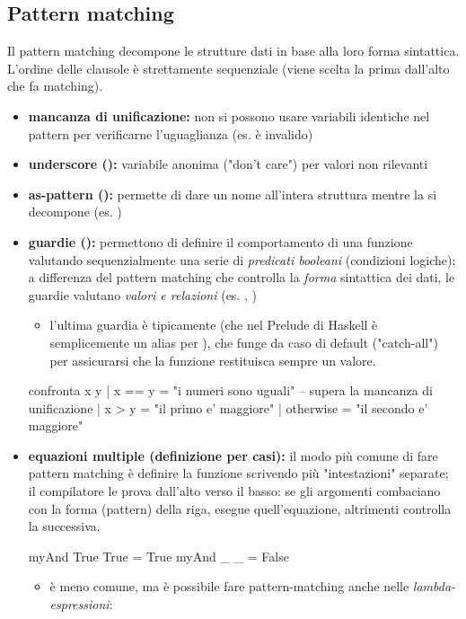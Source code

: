 \subsection{Pattern matching}
Il pattern matching decompone le strutture dati in base alla loro forma sintattica. L'ordine delle clausole è strettamente sequenziale (viene scelta la prima dall'alto che fa matching).
\begin{itemize}
    \item \textbf{mancanza di unificazione:} non si possono usare variabili identiche nel pattern per verificarne l'uguaglianza (es.  è invalido)
    \item \textbf{underscore (\code{\_}):} variabile anonima ("don't care") per valori non rilevanti
    \item \textbf{as-pattern ():} permette di dare un nome all'intera struttura mentre la si decompone (es. )
\item \textbf{guardie (\code{|}):} permettono di definire il comportamento di una funzione valutando sequenzialmente una serie di \textit{predicati booleani} (condizioni logiche); a differenza del pattern matching che controlla la \textit{forma} sintattica dei dati, le guardie valutano \textit{valori e relazioni} (es. , )
    \begin{itemize}
    \item l'ultima guardia è tipicamente  (che nel Prelude di Haskell è semplicemente un alias per ), che funge da caso di default ("catch-all") per assicurarsi che la funzione restituisca sempre un valore.
    \end{itemize}
\begin{haskellbox}{}
confronta x y
  | x == y    = "i numeri sono uguali" -- supera la mancanza di unificazione
  | x > y     = "il primo e' maggiore"
  | otherwise = "il secondo e' maggiore"
\end{haskellbox}{}
\item \textbf{equazioni multiple (definizione per casi):} il modo più comune di fare pattern matching è definire la funzione scrivendo più "intestazioni" separate; il compilatore le prova dall'alto verso il basso: se gli argomenti combaciano con la forma (pattern) della riga, esegue quell'equazione, altrimenti controlla la successiva.
\begin{haskellbox}{}
    myAnd True True = True
    myAnd   _   _   = False
\end{haskellbox}{}
\begin{itemize}
    \item è meno comune, ma è possibile fare pattern-matching anche nelle \textit{lambda-espressioni}:
\end{itemize}
\end{itemize}

